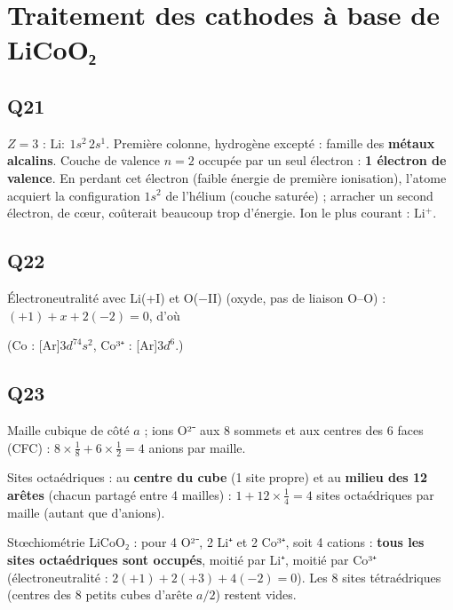\documentclass[11pt,a4paper]{article}
\newcommand{\equationajustee}[1]{%
  \sbox{\boiteequation}{$\displaystyle #1$}%
  \ifdim\wd\boiteequation>\linewidth
    \[\resizebox{\linewidth}{!}{\usebox{\boiteequation}}\]%
  \else
    \[#1\]%
  \fi}
\begin{document}
\hypertarget{traitement-des-cathodes-uxe0-base-de-licooux2082}{%
\section{Traitement des cathodes à base de LiCoO₂}\label{traitement-des-cathodes-uxe0-base-de-licooux2082}}

\hypertarget{q21}{%
\subsection{Q21}\label{q21}}

\(Z=3\) : \(\mathrm{Li}:\ 1s^2\,2s^1\). Première colonne, hydrogène excepté : famille des \textbf{métaux alcalins}. Couche de valence \(n=2\) occupée par un seul électron : \textbf{1 électron de valence}. En perdant cet électron (faible énergie de première ionisation), l'atome acquiert la configuration \(1s^2\) de l'hélium (couche saturée) ; arracher un second électron, de cœur, coûterait beaucoup trop d'énergie. Ion le plus courant : \(\boxed{\mathrm{Li^+}}\).

\hypertarget{q22}{%
\subsection{Q22}\label{q22}}

Électroneutralité avec Li(+I) et O(−II) (oxyde, pas de liaison O--O) : \((+1)+x+2(-2)=0\), d'où

\equationajustee{\boxed{\text{n.o.(Co)}=+\mathrm{III}}}

(Co : {[}Ar{]}\(3d^74s^2\), Co³⁺ : {[}Ar{]}\(3d^6\).)

\hypertarget{q23}{%
\subsection{Q23}\label{q23}}

Maille cubique de côté \(a\) ; ions O²⁻ aux 8 sommets et aux centres des 6 faces (CFC) : \(8\times\frac18+6\times\frac12=4\) anions par maille.

Sites octaédriques : au \textbf{centre du cube} (1 site propre) et au \textbf{milieu des 12 arêtes} (chacun partagé entre 4 mailles) : \(1+12\times\frac14=\boxed{4}\) sites octaédriques par maille (autant que d'anions).

Stœchiométrie LiCoO₂ : pour 4 O²⁻, 2 Li⁺ et 2 Co³⁺, soit 4 cations : \textbf{tous les sites octaédriques sont occupés}, moitié par Li⁺, moitié par Co³⁺ (électroneutralité : \(2(+1)+2(+3)+4(-2)=0\)). Les 8 sites tétraédriques (centres des 8 petits cubes d'arête \(a/2\)) restent vides.
\end{document}
